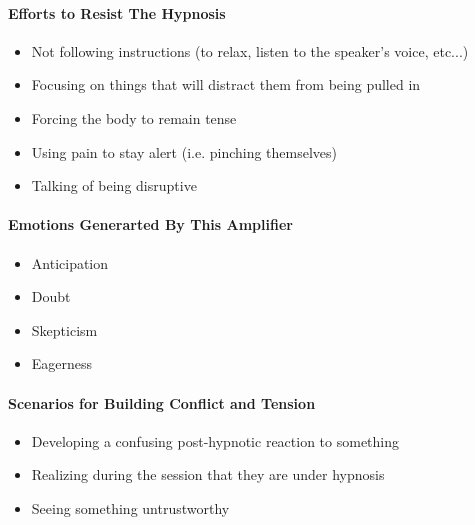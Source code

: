 \paragraph{Efforts to Resist The Hypnosis}



\begin{itemize}
    \item Not following instructions (to relax, listen to the speaker's voice, etc...)
    \item Focusing on things that will distract them from being pulled in
    \item Forcing the body to remain tense
    \item Using pain to stay alert (i.e. pinching themselves)
    \item Talking of being disruptive 
\end{itemize}




\paragraph{Emotions Generarted By This Amplifier}

\begin{itemize}
    \item Anticipation
    \item Doubt
    \item Skepticism
    \item Eagerness
\end{itemize}

\paragraph{Scenarios for Building Conflict and Tension}



\begin{itemize}
    \item Developing a confusing post-hypnotic reaction to something
    \item Realizing during the session that they are under hypnosis
    \item Seeing something untrustworthy
\end{itemize}